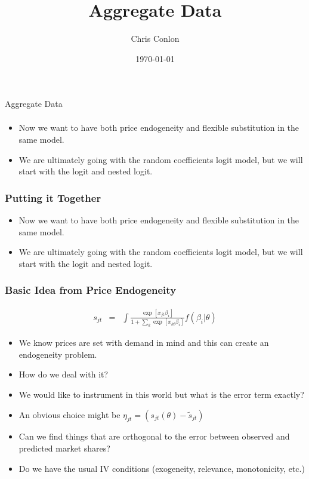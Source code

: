 \documentclass[xcolor=pdftex,dvipsnames,table,mathserif,aspectratio=169]{beamer}
\begin{document}
\title{Aggregate Data}
\author{Chris Conlon}
\date{\today}

\frame{\titlepage}

\begin{frame}{Aggregate Data}
\begin{align*}

\end{align*}

 \begin{itemize}
\item Now we want to have both \alert{price endogeneity} and \alert{flexible substitution} in the same model.
\item We are ultimately going with the random coefficients logit model, but we will start with the logit and nested logit.
 \end{itemize}
\end{frame}


\begin{frame}
\frametitle{Putting it Together}
 \begin{itemize}
\item Now we want to have both \alert{price endogeneity} and \alert{flexible substitution} in the same model.
\item We are ultimately going with the random coefficients logit model, but we will start with the logit and nested logit.
 \end{itemize}
\end{frame}

\begin{frame}
\frametitle{Basic Idea from Price Endogeneity}
\begin{eqnarray*}
s_{jt} &=& \int \frac{\exp[x_{jt} \beta_i  ]}{1+\sum_k \exp[x_{kt} \beta_i ]} f(\beta_i | \theta)
\end{eqnarray*}
\begin{itemize}
\item We know prices are set with demand in mind and this can create an endogeneity problem.
\item How do we deal with it?
\item We would like to instrument in this world but what is the error term exactly?
\item An obvious choice might be $\eta_{jt} = (s_{jt}(\theta)-\tilde{s}_{jt} )$
\item Can we find things that are orthogonal to the error between observed and predicted market shares?
\item Do we have the usual IV conditions (exogeneity, relevance, monotonicity, etc.)
\end{itemize}
\end{frame}
\end{document}

